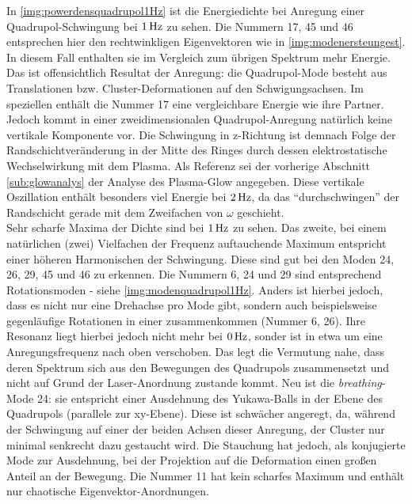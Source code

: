 \documentclass[numbers=noenddot,a4paper,notitlepage,twoside,BCOR15mm]{scrbook}
\newcommand{\tilt}[1]{\textit{#1}}
\begin{document}
						In \autoref{img:powerdensquadrupol1Hz} ist die Energiedichte bei Anregung einer Quadrupol-Schwingung bei $\unit[1]{Hz}$ zu sehen. Die Nummern 17, 45 und 46 entsprechen hier den rechtwinkligen Eigenvektoren wie in \autoref{img:modenersteungest}. In diesem Fall enthalten sie im Vergleich zum übrigen Spektrum mehr Energie. Das ist offensichtlich Resultat der Anregung: die Quadrupol-Mode besteht aus Translationen bzw. Cluster-Deformationen auf den Schwigungsachsen. Im speziellen enthält die Nummer 17 eine vergleichbare Energie wie ihre Partner. Jedoch kommt in einer zweidimensionalen Quadrupol-Anregung natürlich keine vertikale Komponente vor. Die Schwingung in z-Richtung ist demnach Folge der Randschichtveränderung in der Mitte des Ringes durch dessen elektrostatische Wechselwirkung mit dem Plasma. Als Referenz sei der vorherige Abschnitt \ref{sub:glowanalys} der Analyse des Plasma-Glow angegeben. Diese vertikale Oszillation enthält besonders viel Energie bei $\unit[2]{Hz}$, da das "`durchschwingen"' der Randschicht gerade mit dem Zweifachen von $\omega$ geschieht.\\
						Sehr scharfe Maxima der Dichte sind bei $\unit[1]{Hz}$ zu sehen. Das zweite, bei einem natürlichen (zwei) Vielfachen der Frequenz auftauchende Maximum entspricht einer höheren Harmonischen der Schwingung. Diese sind gut bei den Moden 24, 26, 29, 45 und 46 zu erkennen. Die Nummern 6, 24 und 29 sind entsprechend Rotationsmoden - siehe \autoref{img:modenquadrupol1Hz}. Anders ist hierbei jedoch, dass es nicht nur eine Drehachse pro Mode gibt, sondern auch beispielsweise gegenläufige Rotationen in einer zusammenkommen (Nummer 6, 26). Ihre Resonanz liegt hierbei jedoch nicht mehr bei $\unit[0]{Hz}$, sonder ist in etwa um eine Anregungsfrequenz nach oben verschoben. Das legt die Vermutung nahe, dass deren Spektrum sich aus den Bewegungen des Quadrupols zusammensetzt und nicht auf Grund der Laser-Anordnung zustande kommt. Neu ist die \tilt{breathing}-Mode 24: sie entspricht einer Ausdehnung des Yukawa-Balls in der Ebene des Quadrupols (parallele zur xy-Ebene). Diese ist schwächer angeregt, da, während der Schwingung auf einer der beiden Achsen dieser Anregung, der Cluster nur minimal senkrecht dazu gestaucht wird. Die Stauchung hat jedoch, als konjugierte Mode zur Ausdehnung, bei der Projektion auf die Deformation einen großen Anteil an der Bewegung. Die Nummer 11 hat kein scharfes Maximum und enthält nur chaotische Eigenvektor-Anordnungen.
\end{document}
